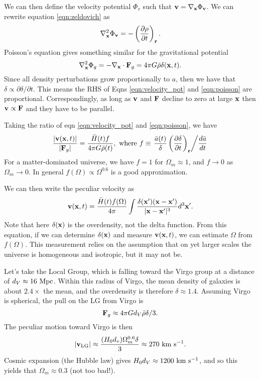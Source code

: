 \documentclass[]{article}
\begin{document}
We can then define the velocity potential $\Phi_v$ such that 
$\mathbf{v} = \nabla_{\mathbf{x}} \Phi_{\mathbf{v}}$. We can rewrite equation \ref{eqn:zeldovich} as
\begin{equation}
\label{eqn:velocity_pot}
\nabla_{\mathbf{x}}^2 \Phi_{\mathbf{v}} = -\left(\frac{\partial \rho}{\partial t}\right)_{\mathbf{r}}.
\end{equation}
\noindent
Poisson's equation gives something similar for the gravitational
potential
\begin{equation}
\label{eqn:poisson}
\nabla_{\mathbf{x}}^2 \Phi_g = - \nabla_{\mathbf{x}} \cdot \mathbf{F}_g = 4 \pi G \bar{\rho} \delta(\mathbf{x},t).
\end{equation}
\noindent
Since all density perturbations grow proportionally to $a$, then we have
that $\delta \propto \partial \delta / \partial t$.  This means the
RHS of Eqns \ref{eqn:velocity_pot} and \ref{eqn:poisson} are proportional.
Correspondingly, as long as $\mathbf{v}$ and $\mathbf{F}$ decline to zero at large 
$\mathbf{x}$ then $\mathbf{v} \propto \mathbf{F}$ and they have to be parallel.

Taking the ratio of eqn \ref{eqn:velocity_pot} and \ref{eqn:poisson}, we have
\begin{equation}
\frac{|\mathbf{v}(\mathbf{x},t)|}{|\mathbf{F}_g|} = \frac{\bar{H}(t) f}{4\pi G \bar{\rho}(t)},~\mathrm{where}~f \equiv \left.\frac{\bar{a}(t)}{\delta}\left(\frac{\partial \delta}{\partial t}\right)_{\mathbf{r}} \middle/\frac{d\bar{a}}{dt}\right. 
\end{equation}
\noindent
For a matter-dominated universe, we have $f=1$ for $\Omega_m\approx1$,
and $f\to0$ as $\Omega_m\to0$.  In general $f(\Omega)\propto\Omega^{0.6}$
is a good approximation.

We can then write the peculiar velocity as
\begin{equation}
\mathbf{v}(\mathbf{x},t) = \frac{\bar{H}(t) f(\Omega)}{4\pi}\int \frac{\delta(\mathbf{x}')(\mathbf{x}-\mathbf{x}')}{|\mathbf{x}-\mathbf{x}'|^3}d^3\mathbf{x}'.
\end{equation}
\noindent
Note that here $\delta(\mathbf{x})$ is the overdensity, not the delta function.
From this equation, if we can determine $\delta(\mathbf{x})$ and measure 
$\mathbf{v}(\mathbf{x},t)$, we can estimate $\Omega$ from $f(\Omega)$. This measurement
relies on the assumption that on yet larger scales the universe is
homogeneous and isotropic, but it may not be.  

Let's take the Local Group, which is falling toward the Virgo group at
a distance of $d_V \approx 16~\mathrm{Mpc}$. Within this radius of Virgo, the
mean density of galaxies is about $2.4\times$ the mean, and the overdensity
is therefore $\delta\approx1.4$.  Assuming Virgo is spherical, the
pull on the LG from Virgo is
\begin{equation}
\mathbf{F}_g \approx 4\pi G d_V \bar{\rho} \delta / 3.
\end{equation}
\noindent
The peculiar motion toward Virgo is then
\begin{equation}
|\mathbf{v}_{\mathrm{LG}}| \approx \frac{(H_0 d_v)\Omega_m^{0.6}\delta}{3} \approx 270~\mathrm{km}~\mathrm{s}^{-1}.
\end{equation}
Cosmic expansion (the Hubble law) gives $H_0 d_V \approx 1200~\mathrm{km}~\mathrm{s}^{-1}$,
and so this yields that $\Omega_m\approx0.3$ (not too bad!).
\end{document}
